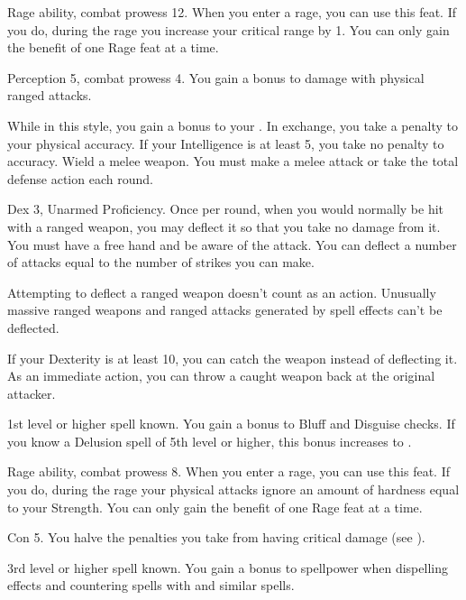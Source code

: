 \featpres Rage ability, combat prowess 12.
\featben When you enter a rage, you can use this feat. If you do, during the rage you increase your critical range by 1.
 You can only gain the benefit of one Rage feat at a time.

\featpres Perception 5, combat prowess 4.
\featben You gain a  bonus to damage with physical ranged attacks.

\featben While in this style, you gain a  bonus to your .
In exchange, you take a  penalty to your physical accuracy.
If your Intelligence is at least 5, you take no penalty to accuracy.
\stylereq Wield a melee weapon. You must make a melee attack or take the total defense action each round.

\featpres Dex 3, Unarmed Proficiency.
\featben Once per round, when you would normally be hit with a ranged weapon, you may deflect it so that you take no damage from it.
You must have a free hand and be aware of the attack.
You can deflect a number of attacks equal to the number of strikes you can make.
\par Attempting to deflect a ranged weapon doesn't count as an action.
Unusually massive ranged weapons and ranged attacks generated by spell effects can't be deflected.
\par If your Dexterity is at least 10, you can catch the weapon instead of deflecting it.
As an immediate action, you can throw a caught weapon back at the original attacker.

\featpre 1st level or higher  spell known.
\featben You gain a  bonus to Bluff and Disguise checks.
If you know a Delusion spell of 5th level or higher, this bonus increases to .

\featpres Rage ability, combat prowess 8.
\featben When you enter a rage, you can use this feat. If you do, during the rage your physical attacks ignore an amount of hardness equal to your Strength.
 You can only gain the benefit of one Rage feat at a time.

\featpre Con 5.
\featben You halve the penalties you take from having critical damage (see ).

\featpre 3rd level or higher  spell known.
\featben You gain a  bonus to spellpower when dispelling effects and countering spells with  and similar spells.

